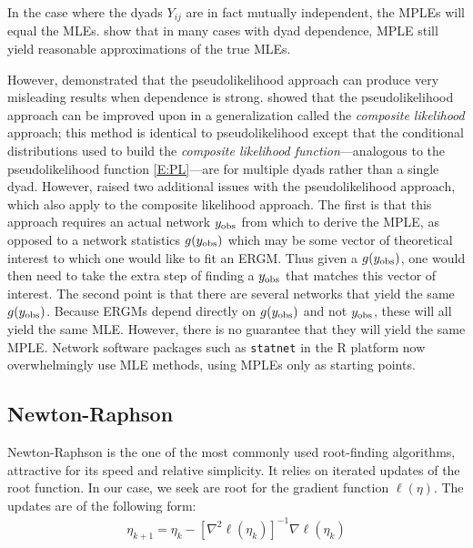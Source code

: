 In the case where the dyads $Y_{ij}$ are in fact mutually independent, the MPLEs will equal the MLEs.  
\citet{Strauss:1990} show that in 
many cases with dyad dependence, MPLE still yield reasonable approximations of the 
true MLEs.  

However, \citet*{Geyer:1992, Snijders:2002, Duijn:2009} demonstrated that 
the pseudolikelihood approach can produce very misleading results 
when dependence is strong.  
\citet*{Composite} showed that the pseudolikelihood approach can be 
improved upon in a generalization 
called the \emph{composite likelihood} approach; this method is identical
to pseudolikelihood except that the conditional distributions used to build the \emph{composite likelihood function}---analogous to the pseudolikelihood function \eqref{E:PL}---are for multiple dyads rather than a single dyad.
However, \citet{Hummel} raised two additional issues with the pseudolikelihood approach, 
which also apply to the composite likelihood approach. 
The first is that this approach requires
an actual network $y_{\text{obs}}$ from which to derive the MPLE, as opposed to a network
statistics $g(y_{\text{obs}})$ which may be some vector of theoretical interest to 
which one would like to fit an ERGM.  Thus given a $g(y_{\text{obs}})$, one would then
need to take the extra step of finding a $y_{\text{obs}}$ that matches this vector of
interest.  The second point is that there are several networks that
yield the same $g(y_{\text{obs}})$.  Because ERGMs depend directly on $g(y_{\text{obs}})$ and not $y_{\text{obs}}$,
these will all yield the same MLE.  However, there is no guarantee that they will yield the same MPLE.
Network software packages such as \texttt{statnet} \citep*{statnet:R} in the R 
platform now overwhelmingly use MLE methods, using MPLEs only as starting points.


\subsection{Newton-Raphson}
Newton-Raphson is the one of the most commonly used root-finding algorithms, attractive
for its speed and relative simplicity.  It relies on iterated updates of the root 
function.  In our case, we seek are root for the gradient function $\ell(\eta)$.
The updates are of the following form:
\begin{align}
	\eta_{k+1} = \eta_k - \left[ \nabla^2 \ell(\eta_k) \right ]^{-1} \nabla \ell(\eta_k) 	
\end{align}



